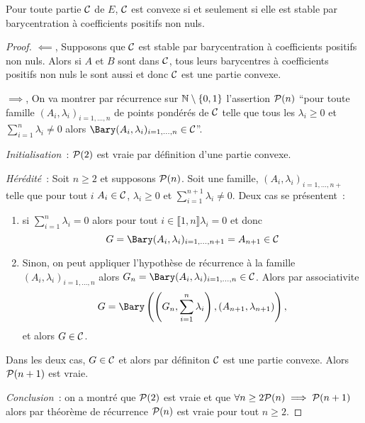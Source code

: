 \begin{prop}
  Pour toute partie $\courbe{}$ de $E$, $\courbe{}$ est convexe si et seulement si elle est stable par barycentration à coefficients positifs non nuls.
\end{prop}
\begin{proof}
  $\impliedby$, Supposons que  $\courbe{}$ est stable par barycentration à coefficients positifs non nuls. Alors si $A$ et $B$ sont dans $\courbe{}$, tous leurs barycentres à coefficients positifs non nuls le sont aussi et donc $\courbe{}$ est une partie convexe.
  
  $\implies$, On va montrer par récurrence sur $\N\setminus\{0,1\}$ l'assertion $\P(n)$ ``pour toute famille $(A_i,\lambda_i)_{i =1, \ldots, n}$ de points pondérés de $\courbe{}$ telle que tous les $\lambda_i \geq 0$ et $\sum_{i=1}^n \lambda_i\neq 0$ alors $\Bary(A_i,\lambda_i)_{i=1, \ldots, n} \in \courbe{}$''.
  
  \emph{Initialisation}~: $\P(2)$ est vraie par définition d'une partie convexe.
  
  \emph{Hérédité}~: Soit $n \geq 2$ et supposons $\P(n)$. Soit une famille, $(A_{i}, \lambda_i)_{i=1, \ldots, n+}$ telle que pour tout $i$ $A_{i} \in \courbe{}$, $\lambda_{i} \geq 0$ et $\sum_{i=1}^{n+1}\lambda_i \neq 0$. Deux cas se présentent~:
  \begin{enumerate}
  \item si $\sum_{i=1}^{n}\lambda_i =0$ alors pour tout $i \in \llbracket 1,n \rrbracket \lambda_i =0$ et donc 
    \begin{equation}
      G=\Bary(A_i,\lambda_i)_{i=1, \ldots, n+1}=A_{n+1} \in \courbe{}
    \end{equation}
  \item Sinon, on peut appliquer l'hypothèse de récurrence à la famille $(A_i,\lambda_i)_{i=1, \ldots, n}$ alors $G_n=\Bary(A_i,\lambda_i)_{i=1,\ldots, n} \in \courbe{}$.
    Alors par associativite 
    \begin{equation}
      G=\Bary\left(\left(G_n,\sum_{i=1}^n \lambda_i\right), (A_{n+1}, \lambda_{n+1})\right),
    \end{equation}
    et alors $G \in \courbe{}$.
  \end{enumerate}
  Dans les deux cas, $G \in \courbe{}$ et alors par définiton $\courbe{}$ est une partie convexe. Alors $\P(n+1)$ est vraie.

  \emph{Conclusion}~: on a montré que $\P(2)$ est vraie et que $\forall n \geq 2 \P(n) \implies \P(n+1)$ alors par théorème de récurrence $\P(n)$ est vraie pour tout $n \geq 2$.
\end{proof}

